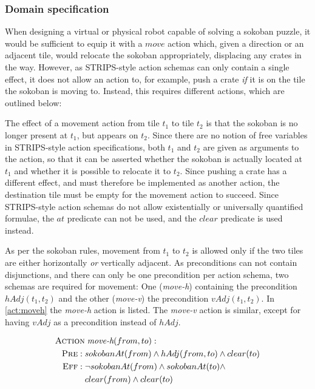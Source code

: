 \documentclass[../Master.tex]{subfiles}
\begin{document}
\graphicspath{{.../Graphics/}}

\subsubsection*{Domain specification}
When designing a virtual or physical robot capable of solving a sokoban puzzle, it would be sufficient to equip it with a $move$ action which, given a direction or an adjacent tile, would relocate the sokoban appropriately, displacing any crates in the way. However, as STRIPS-style action schemas can only contain a single effect, it does not allow an action to, for example, push a crate \textit{if}  it is on the tile the sokoban is moving to. Instead, this requires different actions, which are outlined below:

The effect of a movement action from tile $t_1$ to tile $t_2$ is that the sokoban is no longer present at $t_1$, but appears on $t_2$. Since there are no notion of free variables in STRIPS-style action specifications, both $t_1$ and $t_2$ are given as arguments to the action, so that it can be asserted whether the sokoban is actually located at $t_1$ and whether it is possible to relocate it to $t_2$. Since pushing a crate has a different effect, and must therefore be implemented as another action, the destination tile must be empty for the movement action to succeed. Since STRIPS-style action schemas do not allow existentially or universally quantified formulae, the $at$ predicate can not be used, and the $clear$ predicate is used instead.

As per the sokoban rules, movement from $t_1$ to $t_2$ is allowed only if the two tiles are either horizontally \textit{or} vertically adjacent. As preconditions can not contain disjunctions, and there can only be one precondition per action schema, two schemas are required for movement: One (\textit{move-h}) containing the precondition $hAdj(t_1,t_2)$ and the other (\textit{move-v}) the precondition $vAdj(t_1, t_2)$.
In \eqref{act:moveh} the \textit{move-h} action is listed. The \textit{move-v} action is similar, except for having $vAdj$ as a precondition instead of $hAdj$.

\begin{align}
\begin{split} \label{act:moveh}
\textsc{Action} &\; \textit{move-h}(from, to): \\
\textsc{Pre}: \; & sokobanAt(from) \land hAdj(from, to) \land clear(to) \\
\textsc{Eff}: \; & \neg sokobanAt(from) \land sokobanAt(to) \land \\
& clear(from) \land clear(to)
\end{split}
\end{align}
\end{document}
